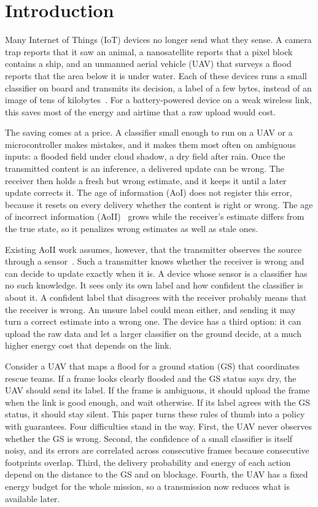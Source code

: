 \documentclass[5p,twocolumn]{elsarticle}
\theoremstyle{remark}
\begin{document}
\section{Introduction}\label{sec:intro}
Many Internet of Things (IoT) devices no longer send what they sense. A camera trap reports that it saw an animal, a nanosatellite reports that a pixel block contains a ship, and an unmanned aerial vehicle (UAV) that surveys a flood reports that the area below it is under water. Each of these devices runs a small classifier on board and transmits its decision, a label of a few bytes, instead of an image of tens of kilobytes~\cite{shamsoshoara2021flame,kyrkou2020aider}. For a battery-powered device on a weak wireless link, this saves most of the energy and airtime that a raw upload would cost.

The saving comes at a price. A classifier small enough to run on a UAV or a microcontroller makes mistakes, and it makes them most often on ambiguous inputs: a flooded field under cloud shadow, a dry field after rain. Once the transmitted content is an inference, a delivered update can be wrong. The receiver then holds a fresh but wrong estimate, and it keeps it until a later update corrects it. The age of information (AoI) does not register this error, because it resets on every delivery whether the content is right or wrong. The age of incorrect information (AoII)~\cite{maatouk2020aoii} grows while the receiver's estimate differs from the true state, so it penalizes wrong estimates as well as stale ones.

Existing AoII work assumes, however, that the transmitter observes the source through a sensor~\cite{maatouk2020aoii,zakeri2023aoiieh,ngo2025eh}. Such a transmitter knows whether the receiver is wrong and can decide to update exactly when it is. A device whose sensor is a classifier has no such knowledge. It sees only its own label and how confident the classifier is about it. A confident label that disagrees with the receiver probably means that the receiver is wrong. An unsure label could mean either, and sending it may turn a correct estimate into a wrong one. The device has a third option: it can upload the raw data and let a larger classifier on the ground decide, at a much higher energy cost that depends on the link.

Consider a UAV that maps a flood for a ground station (GS) that coordinates rescue teams. If a frame looks clearly flooded and the GS status says dry, the UAV should send its label. If the frame is ambiguous, it should upload the frame when the link is good enough, and wait otherwise. If its label agrees with the GS status, it should stay silent. This paper turns these rules of thumb into a policy with guarantees. Four difficulties stand in the way. First, the UAV never observes whether the GS is wrong. Second, the confidence of a small classifier is itself noisy, and its errors are correlated across consecutive frames because consecutive footprints overlap. Third, the delivery probability and energy of each action depend on the distance to the GS and on blockage. Fourth, the UAV has a fixed energy budget for the whole mission, so a transmission now reduces what is available later.
\end{document}
